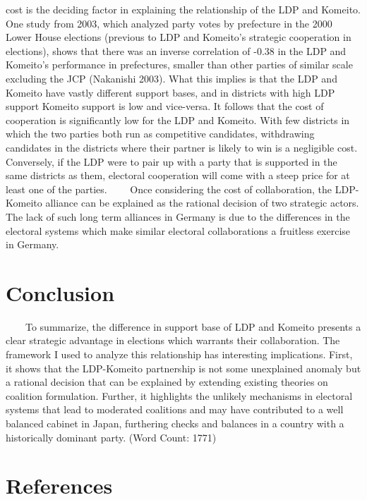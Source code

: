 \documentclass[
]{article}
\begin{document}
cost is the deciding factor in explaining the relationship of the LDP
and Komeito. One study from 2003, which analyzed party votes by
prefecture in the 2000 Lower House elections (previous to LDP and
Komeito's strategic cooperation in elections), shows that there was an
inverse correlation of -0.38 in the LDP and Komeito's performance in
prefectures, smaller than other parties of similar scale excluding the
JCP (Nakanishi 2003). What this implies is that the LDP and Komeito have
vastly different support bases, and in districts with high LDP support
Komeito support is low and vice-versa. It follows that the cost of
cooperation is significantly low for the LDP and Komeito. With few
districts in which the two parties both run as competitive candidates,
withdrawing candidates in the districts where their partner is likely to
win is a negligible cost. Conversely, if the LDP were to pair up with a
party that is supported in the same districts as them, electoral
cooperation will come with a steep price for at least one of the
parties. ~~~~Once considering the cost of collaboration, the LDP-Komeito
alliance can be explained as the rational decision of two strategic
actors. The lack of such long term alliances in Germany is due to the
differences in the electoral systems which make similar electoral
collaborations a fruitless exercise in Germany.

\hypertarget{conclusion}{%
\section{Conclusion}\label{conclusion}}

~~~~To summarize, the difference in support base of LDP and Komeito
presents a clear strategic advantage in elections which warrants their
collaboration. The framework I used to analyze this relationship has
interesting implications. First, it shows that the LDP-Komeito
partnership is not some unexplained anomaly but a rational decision that
can be explained by extending existing theories on coalition
formulation. Further, it highlights the unlikely mechanisms in electoral
systems that lead to moderated coalitions and may have contributed to a
well balanced cabinet in Japan, furthering checks and balances in a
country with a historically dominant party. \hfill (Word Count: 1771)

\hypertarget{references}{%
\section*{References}\label{references}}
\end{document}
